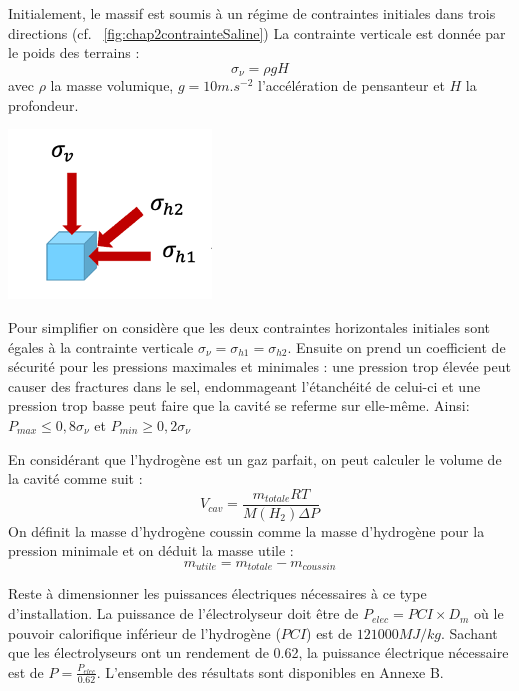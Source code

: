 \documentclass[11pt,french,a4paper]{article}
\begin{document}
\begin{multicols}{2}
Initialement, le massif est soumis à un régime de contraintes initiales dans trois directions (cf. ~\ref{fig:chap2contrainteSaline}) La contrainte verticale est donnée par le poids des terrains : $$\sigma_\nu = \rho g H $$ avec $\rho$ la masse volumique, $g=10 m.s^{-2} $ l'accélération de pensanteur et $H$ la profondeur.
 
\begin{center}
\includegraphics[width=.4\linewidth]{image/chap2/cube_contraintes.png}
\label{fig:chap2contrainteSaline}
\end{center}

\end{multicols}

Pour simplifier on considère que les deux contraintes horizontales initiales sont égales à la contrainte verticale $\sigma_\nu = \sigma_{h1} = \sigma_{h2} $. Ensuite on prend un coefficient de sécurité pour les pressions maximales et minimales : une pression trop élevée peut causer des fractures dans le sel, endommageant l’étanchéité de celui-ci et une pression trop basse peut faire que la cavité se referme sur elle-même. Ainsi: \ $P_{max} \le 0,8 \sigma_{\nu}$ et $ P_{min} \ge 0,2 \sigma_{\nu} $

En considérant que l'hydrogène est un gaz parfait, on peut calculer le volume de la cavité comme suit : $$ V_{cav} = \frac{m_{totale} R T }{ M(H_2) \Delta P} $$ On définit la masse d'hydrogène coussin comme la masse d'hydrogène pour la pression minimale et on déduit la masse utile : $$ m_{utile} = m_{totale} - m_{coussin} $$

Reste à dimensionner les puissances électriques nécessaires à ce type d'installation. La puissance de l'électrolyseur doit être de $P_{elec} = PCI \times D_m $ où le pouvoir calorifique inférieur de l’hydrogène ($PCI$) est de $121 000 MJ/kg$. Sachant que les électrolyseurs ont un rendement de 0.62, la puissance électrique nécessaire est de $P=\frac{P_{elec}}{0.62}$. L'ensemble des résultats sont disponibles en Annexe B.
\end{document}
